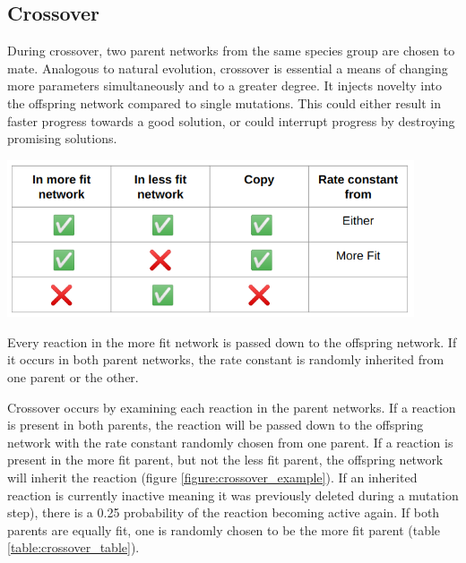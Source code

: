 \documentclass[12pt]{report}
\begin{document}
\subsection{Crossover}
\label{section: crossover}
During crossover, two parent networks from the same species group are chosen to mate. Analogous to natural evolution, crossover is essential a means of changing more parameters simultaneously and to a greater degree. It injects novelty into the offspring network compared to single mutations. This could either result in faster progress towards a good solution, or could interrupt progress by destroying promising solutions.

\begin{table}
	\centering
    \includegraphics[width=12cm]{images/crossover_table.png}
    \caption[Crossover procedure]{Every reaction in the more fit network is passed down to the offspring network. If it occurs in both parent networks, the rate constant is randomly inherited from one parent or the other.}
    \label{table:crossover_table}
\end{table}

Crossover occurs by examining each reaction in the parent networks. If a reaction is present in both parents, the reaction will be passed down to the offspring network with the rate constant randomly chosen from one parent. If a reaction is present in the more fit parent, but not the less fit parent, the offspring network will inherit the reaction (figure \ref{figure:crossover_example}). If an inherited reaction is currently inactive meaning it was previously deleted during a mutation step), there is a 0.25 probability of the reaction becoming active again. If both parents are equally fit, one is randomly chosen to be the more fit parent (table \ref{table:crossover_table}). 
\end{document}
